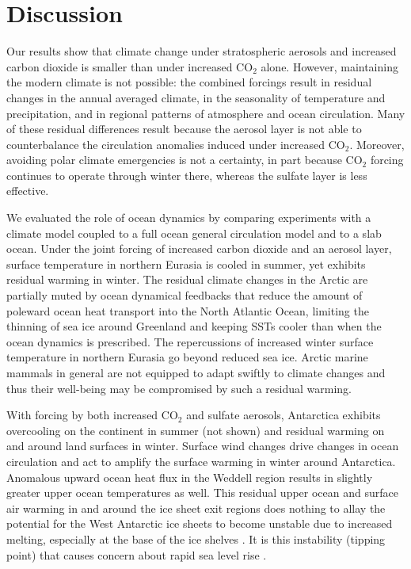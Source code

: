 \documentclass[12pt]{article}
\newcommand{\chapdef}{\section} %
\begin{document}
\chapdef{Discussion}
\label{sec:disc}

Our results show that climate change under stratospheric aerosols and increased carbon dioxide is smaller than under increased CO$_2$ alone. However, maintaining the modern climate is not possible: the combined forcings result in residual changes in the annual averaged climate, in the seasonality of temperature and precipitation, and in regional patterns of atmosphere and ocean circulation. Many of these residual differences result because the aerosol layer is not able to counterbalance the circulation anomalies induced under increased CO$_2$. Moreover, avoiding polar climate emergencies is not a certainty, in part because CO$_2$ forcing continues to operate through winter there, whereas the sulfate layer is less effective. 

We evaluated the role of ocean dynamics by comparing experiments with a climate model coupled to a full ocean general circulation model and to a slab ocean. Under the joint forcing of increased carbon dioxide and an aerosol layer, surface temperature in northern Eurasia is cooled in summer, yet exhibits residual warming in winter. The residual climate changes in the Arctic are partially muted by ocean dynamical feedbacks that reduce the amount of poleward ocean heat transport into the North Atlantic Ocean, limiting the thinning of sea ice around Greenland and keeping SSTs cooler than when the ocean dynamics is prescribed. The repercussions of increased winter surface temperature in northern Eurasia go beyond reduced sea ice. Arctic marine mammals in general are not equipped to adapt swiftly to climate changes \citep{moore08} and thus their well-being may be compromised by such a residual warming.

With forcing by both increased CO$_2$ and sulfate aerosols, Antarctica exhibits overcooling on the continent in summer (not shown) and residual warming on and around land surfaces in winter. Surface wind changes drive changes in ocean circulation and act to amplify the surface warming in winter around Antarctica. Anomalous upward ocean heat flux in the Weddell region results in slightly greater upper ocean temperatures as well. This residual upper ocean and surface air warming in and around the ice sheet exit regions does nothing to allay the potential for the West Antarctic ice sheets to become unstable due to increased melting, especially at the base of the ice shelves \citep{oppenheimer98, meehl07, thoma08, jenkins10}. It is this instability (tipping point) that causes concern about rapid sea level rise \citep{notz09}.
\end{document}
